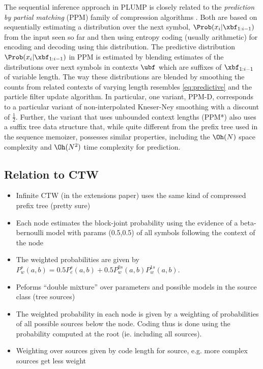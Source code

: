 The sequential inference approach in PLUMP is closely related to the  \emph{prediction by
partial matching} (PPM) family of compression algorithms
\citep{cleary1984dca,moffat1990ipd,howard1993dae,cleary95unboundedlength}.
Both are based on sequentially estimating a distribution over the next symbol,
$\Prob(x_i|\xbf_{1:i-1})$ from the input seen so far and then using entropy
coding (usually arithmetic) for encoding and decoding using this distribution.
The predictive distribution $\Prob(x_i|\xbf_{1:i-1})$ in PPM is estimated by
blending estimates of the distributions over next symbols in contexts $\ubf$
which are suffixes of $\xbf_{1:i-1}$ of variable length. 
The way these distributions are blended by smoothing the counts from
related contexts of varying length resembles \eqref{eq:predictive} and the 
particle filter update algorithm. In particular, one variant, PPM-D, corresponds to a particular variant of
non-interpolated Kneser-Ney smoothing with a discount of $\frac{1}{2}$. 
Further, the  variant that uses unbounded context lengths (PPM*) also uses a suffix tree data structure that, while
quite different from the prefix tree used in the sequence memoizer, possesses
similar properties, including the $\Oh(N)$ space complexity and $\Oh(N^2)$
time complexity for prediction.

\subsection{Relation to CTW}
\begin{itemize}
    \item Infinite CTW (in the extensions paper) uses the same kind of
        compressed prefix tree (pretty sure)
    \item Each node estimates the block-joint probability using the 
        evidence of a beta-bernoulli model with params (0.5,0.5) of all 
        symbols following the context of the node
    \item The weighted probabilities are given by $P^s_w(a,b) = 0.5
        P_e^s(a,b) + 0.5 P_w^{0s}(a,b) P_w^{1s}(a,b)$.
    \item Peforms ``double mixture'' over parameters and possible models in
        the source class (tree sources)
    \item The weighted probability in each node is given by a weighting of 
    probabilities of all possible sources below the node. Coding thus is done
    using the probability computed at the root (ie. including all sources).
    \item Weighting over sources given by code length for source, e.g. more
        complex sources get less weight
\end{itemize}


